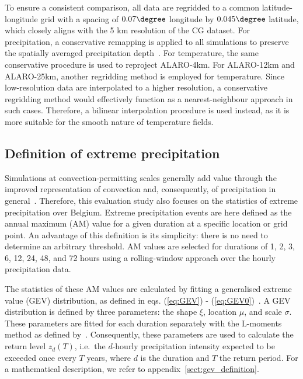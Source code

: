 \documentclass[journal abbreviation, manuscript]{copernicus}
\begin{document}
To ensure a consistent comparison, all data are regridded to a common latitude-longitude grid with a spacing of $0.07\degree$ longitude by $0.045\degree$ latitude, which closely aligns with the 5 km resolution of the CG dataset. 
For precipitation, a conservative remapping is applied to all simulations to preserve the spatially averaged precipitation depth~\citep{jones_first-_1999}. 
For temperature, the same conservative procedure is used to reproject ALARO-4km. 
For ALARO-12km and ALARO-25km, another regridding method is employed for temperature.
Since low-resolution data are interpolated to a higher resolution, a conservative regridding method would effectively function as a nearest-neighbour approach in such cases.
Therefore, a bilinear interpolation procedure is used instead, as it is more suitable for the smooth nature of temperature fields.

\subsection{Definition of extreme precipitation}
\label{sect:methods extreme precipitation}

Simulations at convection-permitting scales generally add value through the improved representation of convection and, consequently, of precipitation in general~\citep{prein_review_2015, ban_evaluation_2014, lucas-picher_convection-permitting_2021,berthou_pan-european_2020}.
Therefore, this evaluation study also focuses on the statistics of extreme precipitation over Belgium. 
Extreme precipitation events are here defined as the annual maximum (AM) value for a given duration at a specific location or grid point. 
An advantage of this definition is its simplicity: there is no need to determine an arbitrary threshold. 
AM values are selected for durations of 1, 2, 3, 6, 12, 24, 48, and 72 hours using a rolling-window approach over the hourly precipitation data. 

The statistics of these AM values are calculated by fitting a generalised extreme value (GEV) distribution, as defined in eqs. (\ref{eq:GEV}) - (\ref{eq:GEV0})~\citep{coles_introduction_2001}. 
A GEV distribution is defined by three parameters: the shape $\xi$, location $\mu$, and scale $\sigma$. 
These parameters are fitted for each duration separately with the L-moments method as defined by~\cite{hosking_l-moments_1990}. 
Consequently, these parameters are used to calculate the return level $z_d(T)$, i.e.\ the $d$-hourly precipitation intensity expected to be exceeded once every $T$ years, where $d$ is the duration and $T$ the return period.
For a mathematical description, we refer to appendix~\ref{sect:gev_definition}.
\end{document}
